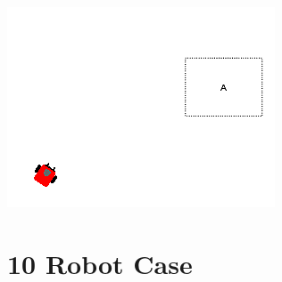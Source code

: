 \begin{minipage}{\linewidth}
	\centering
	\begin{minipage}{0.42\linewidth}
		\includegraphics[width=\linewidth]{../ui_experiment/slide_images/Swarm_Robot_Control_-_Single_Robot_0023.png}
		\label{fig:sub1}
	\end{minipage}
	\label{fig:single_robot_slides_pt2}
\end{minipage}


\section{10 Robot Case}

